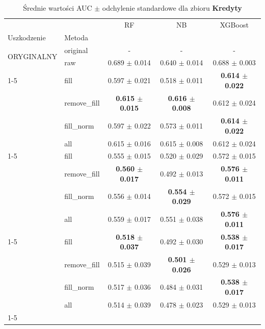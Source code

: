 \begin{table}[htbp]
\caption{Średnie wartości AUC $\pm$ odchylenie standardowe dla zbioru \textbf{Kredyty}}
\label{tab:wyniki_kredyty}
\begin{tabular}{llccc}
\toprule
 &  & RF & NB & XGBoost \\
Uszkodzenie & Metoda &  &  &  \\
\midrule
\multirow[t]{2}{*}{ORYGINALNY} & original & - & - & - \\
 & raw & 0.689 $\pm$ 0.014 & 0.640 $\pm$ 0.014 & 0.688 $\pm$ 0.003 \\
\cline{1-5}
\multirow[t]{5}{*}{20%
 & fill & 0.597 $\pm$ 0.021 & 0.518 $\pm$ 0.011 & \textbf{0.614 $\pm$ 0.022} \\
 & remove_fill & \textbf{0.615 $\pm$ 0.015} & \textbf{0.616 $\pm$ 0.008} & 0.612 $\pm$ 0.024 \\
 & fill_norm & 0.597 $\pm$ 0.022 & 0.573 $\pm$ 0.011 & \textbf{0.614 $\pm$ 0.022} \\
 & all & 0.615 $\pm$ 0.016 & 0.615 $\pm$ 0.008 & 0.612 $\pm$ 0.024 \\
\cline{1-5}
\multirow[t]{5}{*}{40%
 & fill & 0.555 $\pm$ 0.015 & 0.520 $\pm$ 0.029 & 0.572 $\pm$ 0.015 \\
 & remove_fill & \textbf{0.560 $\pm$ 0.017} & 0.492 $\pm$ 0.013 & \textbf{0.576 $\pm$ 0.011} \\
 & fill_norm & 0.556 $\pm$ 0.014 & \textbf{0.554 $\pm$ 0.029} & 0.572 $\pm$ 0.015 \\
 & all & 0.559 $\pm$ 0.017 & 0.551 $\pm$ 0.038 & \textbf{0.576 $\pm$ 0.011} \\
\cline{1-5}
\multirow[t]{5}{*}{60%
 & fill & \textbf{0.518 $\pm$ 0.037} & 0.492 $\pm$ 0.030 & \textbf{0.538 $\pm$ 0.017} \\
 & remove_fill & 0.515 $\pm$ 0.039 & \textbf{0.501 $\pm$ 0.026} & 0.529 $\pm$ 0.013 \\
 & fill_norm & 0.517 $\pm$ 0.036 & 0.484 $\pm$ 0.031 & \textbf{0.538 $\pm$ 0.017} \\
 & all & 0.514 $\pm$ 0.039 & 0.478 $\pm$ 0.023 & 0.529 $\pm$ 0.013 \\
\cline{1-5}
\bottomrule
\end{tabular}
\end{table}
